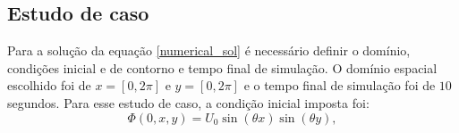 \documentclass[a0,portrait]{a0poster}
\begin{document}
\begin{minipage}[c]{\linewidth}
\begin{framed}
\begin{multicols}{2}
\section*{Estudo de caso}
Para a solução da equação \ref{numerical_sol} é necessário definir o domínio, condições inicial e de contorno e tempo final de simulação. O domínio espacial escolhido foi de $x=[0,2\pi]$ e $y=[0,2\pi]$ e o tempo final de simulação foi de $10$ segundos.
Para esse estudo de caso, a condição inicial imposta foi:
\begin{equation} \label{condicao_inicial}
\Phi(0,x,y)=U_0 \sin\left(\theta x\right) \sin\left(\theta y\right), %

\end{equation}
\end{multicols}
\end{framed}
\end{minipage}
\end{document}
